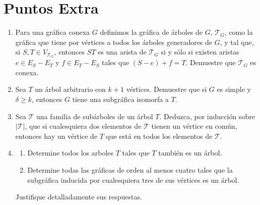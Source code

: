 \documentclass{article}
\begin{document}
\section*{Puntos Extra}
\begin{enumerate}
  \item Para una gr\'afica conexa $G$ definimos la
    gr\'afica de \'arboles de $G$, $\mathcal{T}_G$,
    como la gr\'afica que tiene por v\'ertices a
    todos los \'arboles generadores de $G$, y tal que,
    si $S, T \in V_{\mathcal{T}_G}$, entonces $ST$ es
    una arista de $\mathcal{T}_G$ si y s\'olo si
    existen aristas $e \in E_S - E_T$ y $f \in E_T -
    E_S$ tales que $(S - e) + f = T$.   Demuestre que
    $\mathcal{T}_G$ es conexa.
  \item Sea $T$ un \'arbol arbitrario con $k+1$ v\'ertices.
    Demuestre que si $G$ es simple y $\delta \ge k$,
    entonces $G$ tiene una subgr\'afica isomorfa a $T$.
  \item Sea $\mathcal{T}$ una familia de sub\'arboles
    de un \'arbol $T$.   Deduzca, por inducci\'on sobre
    $|\mathcal{T}|$, que si cualesquiera dos elementos
    de $\mathcal{T}$ tienen un v\'ertice en com\'un,
    entonces hay un v\'ertice de $T$ que est\'a en
    todos los elementos de $\mathcal{T}$.
  \item \begin{enumerate}
    \item Determine todos los arboles $T$ tales que
      $\overline T$ tambi\'en es un \'arbol.

    \item Determine todas las gr\'aficas de orden al
      menos cuatro tales que la subgr\'afica inducida por
      cualesquiera tres de sus v\'ertices es un \'arbol.
    \end{enumerate}
    Justifique detalladamente sus respuestas.

\end{enumerate}
\end{document}
